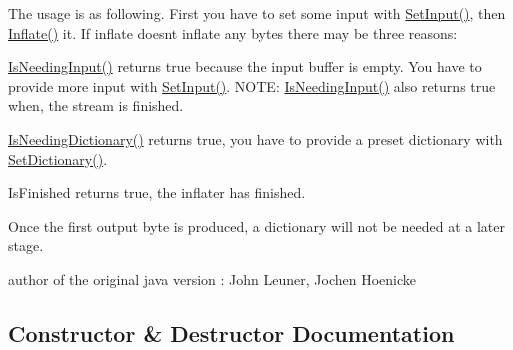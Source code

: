The usage is as following. First you have to set some input with {\ttfamily \hyperlink{class_i_c_sharp_code_1_1_sharp_zip_lib_1_1_zip_1_1_compression_1_1_inflater_ab70e1ce75cf7f35e53d6ad810a0bcec2}{Set\+Input()}}, then \hyperlink{class_i_c_sharp_code_1_1_sharp_zip_lib_1_1_zip_1_1_compression_1_1_inflater_a73bfcbd5d20b4838bd28364fff12324e}{Inflate()} it. If inflate doesn\textquotesingle{}t inflate any bytes there may be three reasons\+: 
\begin{DoxyItemize}
\item \hyperlink{class_i_c_sharp_code_1_1_sharp_zip_lib_1_1_zip_1_1_compression_1_1_inflater_a3033837c6e5987009c6bf51c4952a5fc}{Is\+Needing\+Input()} returns true because the input buffer is empty. You have to provide more input with {\ttfamily \hyperlink{class_i_c_sharp_code_1_1_sharp_zip_lib_1_1_zip_1_1_compression_1_1_inflater_ab70e1ce75cf7f35e53d6ad810a0bcec2}{Set\+Input()}}. N\+O\+TE\+: \hyperlink{class_i_c_sharp_code_1_1_sharp_zip_lib_1_1_zip_1_1_compression_1_1_inflater_a3033837c6e5987009c6bf51c4952a5fc}{Is\+Needing\+Input()} also returns true when, the stream is finished.  
\item \hyperlink{class_i_c_sharp_code_1_1_sharp_zip_lib_1_1_zip_1_1_compression_1_1_inflater_a9db69836f41167ffd5e0d1dc5832594c}{Is\+Needing\+Dictionary()} returns true, you have to provide a preset dictionary with {\ttfamily \hyperlink{class_i_c_sharp_code_1_1_sharp_zip_lib_1_1_zip_1_1_compression_1_1_inflater_a77ae6cd5e3d6cb82e366b0ffb453f4b1}{Set\+Dictionary()}}. 
\item Is\+Finished returns true, the inflater has finished. 
\end{DoxyItemize}Once the first output byte is produced, a dictionary will not be needed at a later stage.

author of the original java version \+: John Leuner, Jochen Hoenicke 

\subsection{Constructor \& Destructor Documentation}
\mbox{\label{class_i_c_sharp_code_1_1_sharp_zip_lib_1_1_zip_1_1_compression_1_1_inflater_aa1518202b80f82414879742fd1bc5e44}} 
